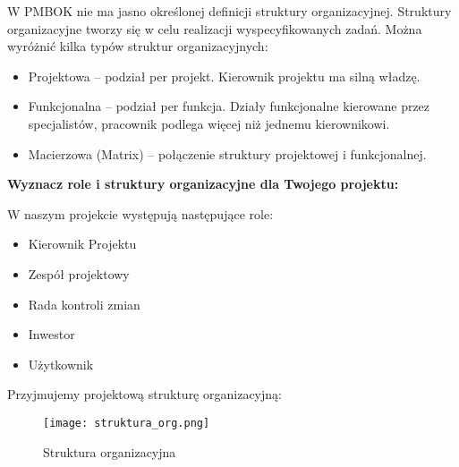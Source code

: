 W PMBOK nie ma jasno określonej definicji struktury organizacyjnej. Struktury organizacyjne tworzy się w celu realizacji wyspecyfikowanych zadań. Można wyróżnić kilka typów struktur organizacyjnych:
\begin{itemize}
\item	Projektowa – podział per projekt. Kierownik projektu ma silną władzę. 
\item	Funkcjonalna – podział per funkcja. Działy funkcjonalne kierowane przez specjalistów, pracownik podlega więcej niż jednemu kierownikowi.
\item	Macierzowa (Matrix) – połączenie struktury projektowej i funkcjonalnej.
\end{itemize}


\textbf{Wyznacz role i struktury organizacyjne dla Twojego projektu:}


W naszym projekcie występują następujące role:
\begin{itemize}
\item Kierownik Projektu
\item Zespół projektowy
\item Rada kontroli zmian
\item Inwestor
\item Użytkownik
\end{itemize}


Przyjmujemy projektową strukturę organizacyjną:
\begin{figure}[!ht]
\begin{center}
\texttt{[image: struktura\_org.png]}
\caption[Struktura organizacyjna]{Struktura organizacyjna}
\label{rysunekProces}
\end{center}
\end{figure}




